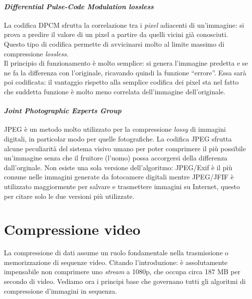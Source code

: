 \paragraph{\textit{Differential Pulse-Code Modulation lossless} \\}
  La codifica DPCM sfrutta la correlazione tra i \emph{pixel} adiacenti di 
  un'immagine: si prova a predire il valore di un pixel a partire da quelli 
  vicini già conosciuti. Questo tipo di codifica permette di avvicinarsi molto 
  al limite massimo di compressione \emph{lossless}.\\
  Il principio di funzionamento è molto semplice: si genera l'immagine predetta 
  e se ne fa la differenza con l'originale, ricavando quindi la funzione 
  ``errore''. Essa sarà poi codificata: il vantaggio rispetto alla semplice 
  codifica dei pixel sta nel fatto che suddetta funzione è molto meno correlata 
  dell'immagine dell'originale.

\paragraph{\textit{Joint Photographic Experts Group} \\}
  JPEG è un metodo molto utilizzato per la compressione \emph{lossy} di 
  immagini digitali, in particolar modo per quelle fotografiche. La codifica 
  JPEG sfrutta alcune peculiarità del sistema visivo umano per poter comprimere 
  il più possibile un'immagine senza che il fruitore (l'uomo) possa accorgersi 
  della differenza dall'orginale. Non esiste una sola versione dell'algoritmo: 
  JPEG/Exif è il più comune nelle immagini generate da fotocamere digitali 
  mentre JPEG/JFIF è utilizzato maggiormente per salvare e trasmettere immagini 
  su Internet, questo per citare solo le due versioni più utilizzate.



\section{Compressione video}

La compressione di dati assume un ruolo fondamentale nella trasmissione o 
memorizzazione di sequenze video. Citando l'introduzione: è assolutamente 
impensabile non comprimere uno \emph{stream} a 1080p, che occupa circa 187 MB 
per secondo di video. Vediamo ora i principi base che governano tutti gli 
algoritmi di compressione d'immagini in sequenza.

